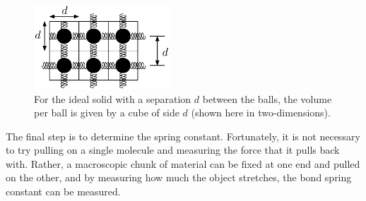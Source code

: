 %

\begin{figure}
\begin{center}
\includegraphics[width=2in]{thermal_energy_and_solids/ball-spring-volume.eps}
\caption{For the ideal solid with a separation $d$ between the 
balls, the volume per ball is given by a cube of side $d$ (shown here
in two-dimensions).}
\label{fig:ball-spring-volume}
\end{center}
\end{figure}


The final step is to determine the spring constant.  Fortunately, it
is not necessary to try pulling on a single molecule and measuring the
force that it pulls back with.  Rather, a macroscopic chunk of
material can be fixed at one end and pulled on the other, and by
measuring how much the object stretches, the bond spring constant can
be measured.


